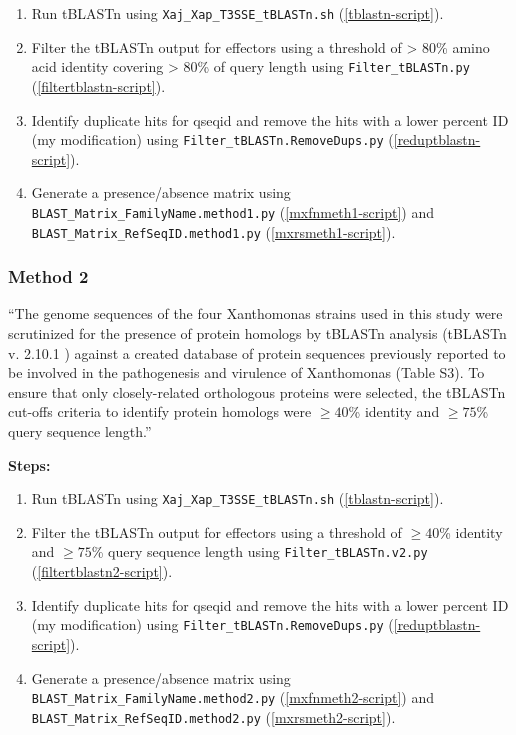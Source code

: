 \documentclass[
]{book}
\providecommand{\tightlist}{%
  \setlength{\itemsep}{0pt}\setlength{\parskip}{0pt}}
\begin{document}
\begin{enumerate}
\def\labelenumi{\arabic{enumi}.}
\tightlist
\item
  Run tBLASTn using \texttt{Xaj\_Xap\_T3SSE\_tBLASTn.sh} (\ref{tblastn-script}).
\item
  Filter the tBLASTn output for effectors using a threshold of \textgreater{} 80\% amino acid identity covering \textgreater{} 80\% of query length using \texttt{Filter\_tBLASTn.py} (\ref{filtertblastn-script}).
\item
  Identify duplicate hits for qseqid and remove the hits with a lower percent ID (my modification) using \texttt{Filter\_tBLASTn.RemoveDups.py} (\ref{reduptblastn-script}).
\item
  Generate a presence/absence matrix using \texttt{BLAST\_Matrix\_FamilyName.method1.py} (\ref{mxfnmeth1-script}) and \texttt{BLAST\_Matrix\_RefSeqID.method1.py} (\ref{mxrsmeth1-script}).
\end{enumerate}

\subsubsection{Method 2}\label{method-2}

\textbf{\citet{Fernandes2021}}

``The genome sequences of the four Xanthomonas strains used in this study were scrutinized for the presence of protein homologs by tBLASTn analysis (tBLASTn v. 2.10.1 ) against a created database of protein sequences previously reported to be involved in the pathogenesis and virulence of Xanthomonas (Table S3). To ensure that only closely-related orthologous proteins were selected, the tBLASTn cut-offs criteria to identify protein homologs were \(\geq 40\)\% identity and \(\geq 75\)\% query sequence length.''

\textbf{Steps:}

\begin{enumerate}
\def\labelenumi{\arabic{enumi}.}
\tightlist
\item
  Run tBLASTn using \texttt{Xaj\_Xap\_T3SSE\_tBLASTn.sh} (\ref{tblastn-script}).
\item
  Filter the tBLASTn output for effectors using a threshold of \(\geq 40\)\% identity and \(\geq 75\)\% query sequence length using \texttt{Filter\_tBLASTn.v2.py} (\ref{filtertblastn2-script}).
\item
  Identify duplicate hits for qseqid and remove the hits with a lower percent ID (my modification) using \texttt{Filter\_tBLASTn.RemoveDups.py} (\ref{reduptblastn-script}).
\item
  Generate a presence/absence matrix using \texttt{BLAST\_Matrix\_FamilyName.method2.py} (\ref{mxfnmeth2-script}) and \texttt{BLAST\_Matrix\_RefSeqID.method2.py} (\ref{mxrsmeth2-script}).
\end{enumerate}
\end{document}

